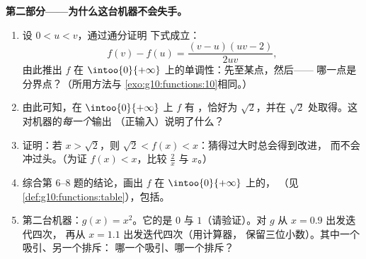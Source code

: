 \begin{problem}
\medskip
\noindent\textbf{第二部分——为什么这台机器不会失手。}
\begin{enumerate}[resume]
  \item 设 $0 < u < v$，通过通分证明
        下式成立：
        \[
        f(v) - f(u) = \frac{(v - u)(uv - 2)}{2uv} ,
        \]
        由此推出 $f$ 在
        $\intoo{0}{+\infty}$ 上的单调性：先至某点，然后——
        哪一点是分界点？（所用方法与
        \cref{exo:g10:functions:10}相同。）
  \item 由此可知，在 $\intoo{0}{+\infty}$ 上 $f$ 有
        ，恰好为 $\sqrt2$，并在
        $\sqrt2$ 处取得。这对机器的\emph{每一个}输出
        （正输入）说明了什么？
  \item 证明：若 $x > \sqrt2$，则
        $\sqrt2 < f(x) < x$：猜得过大时总会得到改进，
        而不会冲过头。（为证 $f(x) < x$，比较 $\frac2x$ 与
        $x$。）
  \item 综合第 6--8 题的结论，画出 $f$ 在
        $\intoo{0}{+\infty}$ 上的，
        （见\cref{def:g10:functions:table}），包括。
  \item 第二台机器：$g(x) = x^2$。它的是
        $0$ 与 $1$（请验证）。对 $g$ 从 $x = 0.9$ 出发迭代四次，
        再从 $x = 1.1$ 出发迭代四次（用计算器，
        保留三位小数）。其中一个吸引、另一个排斥：
        哪一个吸引、哪一个排斥？
\end{enumerate}


\end{problem}
